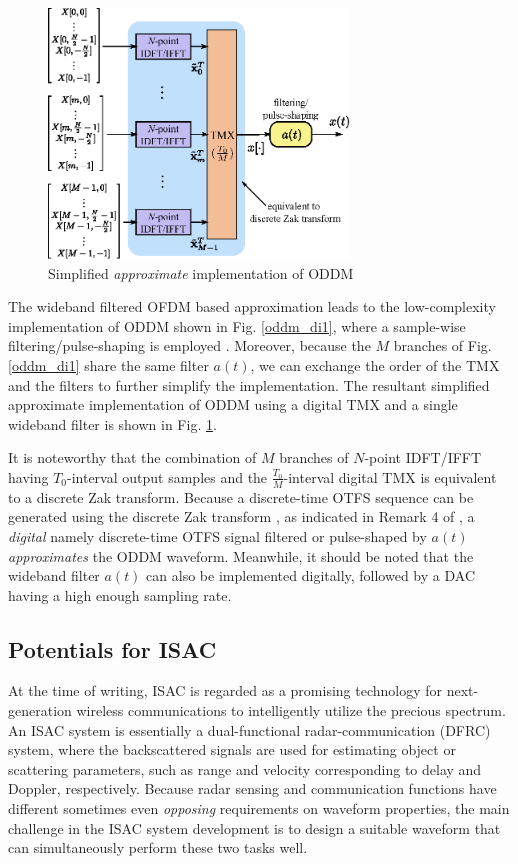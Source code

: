 \documentclass[journal]{IEEEtran}
\begin{document}
{\begin{figure}
  \centering
  \includegraphics[width=8cm]{oddm_di2_v2}
  \caption{Simplified \emph{approximate} implementation of ODDM}
  \label{oddm_di2}
  \vspace*{-3mm}
\end{figure}



The wideband filtered OFDM based approximation leads to the low-complexity implementation of ODDM shown in Fig. \ref{oddm_di1}, where a sample-wise filtering/pulse-shaping is employed \cite{oddm}. Moreover, because the $M$ branches of Fig. \ref{oddm_di1} share the same filter $a(t)$,
we can exchange the order of the TMX and the filters to further simplify the implementation. The resultant simplified approximate implementation of ODDM using a digital TMX and a single wideband filter is shown in Fig. \ref{oddm_di2}. 



It is noteworthy that the combination of {$M$ branches of $N$-point IDFT/IFFT having $T_0$-interval output samples} and the $\frac{T_0}{M}$-interval digital TMX is equivalent to a discrete Zak transform\cite{zak}. {Because a discrete-time  OTFS sequence can be generated using the discrete Zak transform \cite{hadaniyt}, as indicated in Remark 4 of \cite{oddm}, a \emph{digital} namely discrete-time OTFS signal filtered or pulse-shaped by $a(t)$ \emph{approximates} the ODDM waveform.} Meanwhile, it should be noted that the wideband filter $a(t)$ can also be implemented digitally, followed by a DAC having a high enough sampling rate. 





\subsection{Potentials for ISAC}
At the time of writing, {ISAC} is regarded as a promising technology for next-generation wireless communications to intelligently utilize the precious spectrum. An ISAC system is essentially a dual-functional radar-communication (DFRC) system, where the backscattered signals are used for estimating object or {scattering} parameters, such as range and velocity corresponding to delay and Doppler, respectively. Because radar sensing and communication functions have different sometimes even \emph{opposing} requirements on waveform properties, the main challenge in the ISAC system development is to design a suitable waveform that can simultaneously perform these two tasks well\cite{sturm2011}.


}
\end{document}
